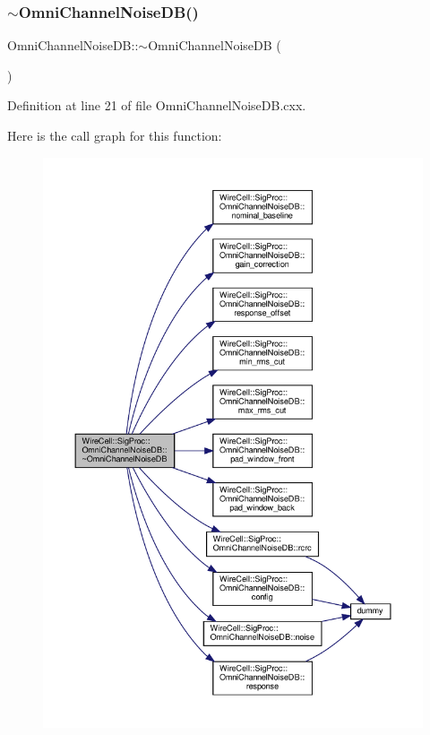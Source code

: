 \subsubsection{\texorpdfstring{$\sim$\+Omni\+Channel\+Noise\+D\+B()}{~OmniChannelNoiseDB()}}
{\footnotesize\ttfamily Omni\+Channel\+Noise\+D\+B\+::$\sim$\+Omni\+Channel\+Noise\+DB (\begin{DoxyParamCaption}{ }\end{DoxyParamCaption})\hspace{0.3cm}{\ttfamily [virtual]}}



Definition at line 21 of file Omni\+Channel\+Noise\+D\+B.\+cxx.

Here is the call graph for this function\+:
\nopagebreak
\begin{figure}[H]
\begin{center}
\leavevmode
\includegraphics[width=350pt]{class_wire_cell_1_1_sig_proc_1_1_omni_channel_noise_d_b_a64273a955c13ca79dc40939d2684b1ff_cgraph}
\end{center}
\end{figure}


